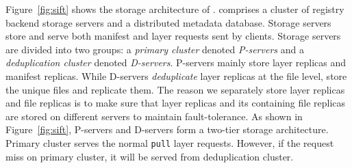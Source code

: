 Figure~\ref{fig:sift} shows the storage architecture of \sysname.
 \sysname comprises a cluster of registry backend storage servers and a distributed metadata database. 
Storage servers store and serve both manifest and layer requests sent by clients.
Storage servers are divided into two groups:
a \emph{primary cluster} denoted \emph{P-servers} and a \emph{deduplication cluster} denoted \emph{D-servers}.
P-servers mainly store layer replicas and manifest replicas.
While D-servers \emph{deduplicate} layer replicas at the file level, 
store the unique files and replicate them.
The reason we separately store layer replicas and 
file replicas is to make sure that
layer replicas and its containing file replicas are stored on different servers to maintain
fault-tolerance.
As shown in Figure~\ref{fig:sift},
P-servers and D-servers 
form a two-tier storage architecture.
Primary cluster serves the normal \texttt{pull} layer requests.
However, if the request miss on primary cluster,
it will be served from deduplication cluster.

